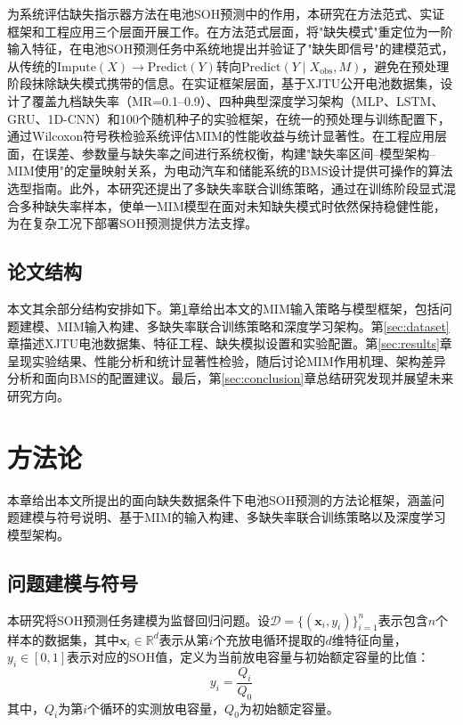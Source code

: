\documentclass[10pt,a4paper]{ctexart}
\begin{document}
为系统评估缺失指示器方法在电池SOH预测中的作用，本研究在方法范式、实证框架和工程应用三个层面开展工作。在方法范式层面，将"缺失模式"重定位为一阶输入特征，在电池SOH预测任务中系统地提出并验证了"缺失即信号"的建模范式，从传统的$\text{Impute}(X)\rightarrow\text{Predict}(Y)$转向$\text{Predict}(Y \mid X_{\mathrm{obs}}, M)$，避免在预处理阶段抹除缺失模式携带的信息。在实证框架层面，基于XJTU公开电池数据集，设计了覆盖九档缺失率（MR=0.1--0.9）、四种典型深度学习架构（MLP、LSTM、GRU、1D-CNN）和100个随机种子的实验框架，在统一的预处理与训练配置下，通过Wilcoxon符号秩检验系统评估MIM的性能收益与统计显著性。在工程应用层面，在误差、参数量与缺失率之间进行系统权衡，构建"缺失率区间--模型架构--MIM使用"的定量映射关系，为电动汽车和储能系统的BMS设计提供可操作的算法选型指南。此外，本研究还提出了多缺失率联合训练策略，通过在训练阶段显式混合多种缺失率样本，使单一MIM模型在面对未知缺失模式时依然保持稳健性能，为在复杂工况下部署SOH预测提供方法支撑。

\subsection{论文结构}\label{sec:organization}

本文其余部分结构安排如下。第\ref{sec:method}章给出本文的MIM输入策略与模型框架，包括问题建模、MIM输入构建、多缺失率联合训练策略和深度学习架构。第\ref{sec:dataset}章描述XJTU电池数据集、特征工程、缺失模拟设置和实验配置。第\ref{sec:results}章呈现实验结果、性能分析和统计显著性检验，随后讨论MIM作用机理、架构差异分析和面向BMS的配置建议。最后，第\ref{sec:conclusion}章总结研究发现并展望未来研究方向。

\section{方法论}\label{sec:method}

本章给出本文所提出的面向缺失数据条件下电池SOH预测的方法论框架，涵盖问题建模与符号说明、基于MIM的输入构建、多缺失率联合训练策略以及深度学习模型架构。

\subsection{问题建模与符号}\label{sec:formulation}

本研究将SOH预测任务建模为监督回归问题。设$\mathcal{D} = \{(\mathbf{x}_i, y_i)\}_{i=1}^{n}$表示包含$n$个样本的数据集，其中$\mathbf{x}_i \in \mathbb{R}^{d}$表示从第$i$个充放电循环提取的$d$维特征向量，$y_i \in [0, 1]$表示对应的SOH值，定义为当前放电容量与初始额定容量的比值：
\begin{equation}
    y_i = \frac{Q_i}{Q_0}
    \label{eq:soh}
\end{equation}
其中，$Q_i$为第$i$个循环的实测放电容量，$Q_0$为初始额定容量。
\end{document}
